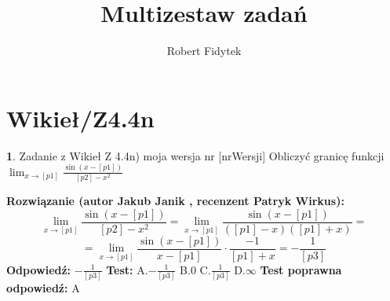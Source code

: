 \documentclass[12pt, a4paper]{article}
\title{Multizestaw zadań}
\author{Robert Fidytek}
\date{}
\theoremstyle{definition} %
\newtheorem{zad}{}
\newcommand{\kategoria}[1]{\section{#1}} %
\newcommand{\zadStart}[1]{\begin{zad}#1\newline} %
\newcommand{\zadStop}{\end{zad}}   %
\newcommand{\rozwStart}[2]{\noindent \textbf{Rozwiązanie (autor #1 , recenzent #2): }\newline} %
\newcommand{\rozwStop}{\newline}                                            %
\newcommand{\odpStart}{\noindent \textbf{Odpowiedź:}\newline}    %
\newcommand{\odpStop}{\newline}                                             %
\newcommand{\testStart}{\noindent \textbf{Test:}\newline} %
\newcommand{\testStop}{\newline} %
\newcommand{\kluczStart}{\noindent \textbf{Test poprawna odpowiedź:}\newline} %
\newcommand{\kluczStop}{\newline} %
\begin{document}
\maketitle


\kategoria{Wikieł/Z4.4n}
\zadStart{Zadanie z Wikieł Z 4.4n) moja wersja nr [nrWersji]}
Obliczyć granicę funkcji $\lim_{x \to [p1]} \frac{\sin{(x-[p1])}}{[p2]-x^2}$
\zadStop
\rozwStart{Jakub Janik}{Patryk Wirkus}
$$\lim_{x \to [p1]} \frac{\sin{(x-[p1])}}{[p2]-x^2}=\lim_{x \to [p1]} \frac{\sin{(x-[p1])}}{([p1]-x)([p1]+x)}=$$
$$=\lim_{x \to [p1]} \frac{\sin{(x-[p1])}}{x-[p1]}\cdot\frac{-1}{[p1]+x}=-\frac{1}{[p3]}$$
\rozwStop
\odpStart
$-\frac{1}{[p3]}$
\odpStop
\testStart
A.$-\frac{1}{[p3]}$
B.$0$
C.$\frac{1}{[p3]}$
D.$\infty$
\testStop
\kluczStart
A
\kluczStop
\end{document}
